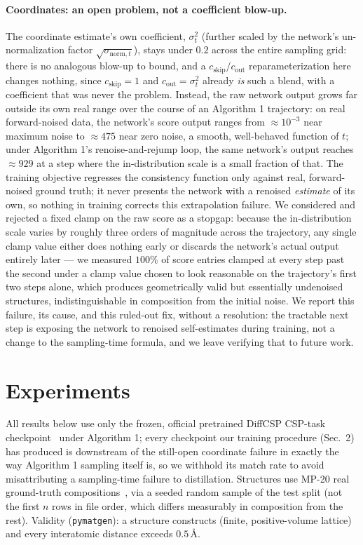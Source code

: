 \documentclass{article}
\begin{document}
\paragraph{Coordinates: an open problem, not a coefficient blow-up.}
\label{sec:coord-track}
The coordinate estimate's own coefficient, $\sigma_t^2$ (further scaled by the network's un-normalization factor $\sqrt{\sigma_{\text{norm},t}}$), stays under $0.2$ across the entire sampling grid: there is no analogous blow-up to bound, and a $c_{\text{skip}}/c_{\text{out}}$ reparameterization here changes nothing, since $c_{\text{skip}}{=}1$ and $c_{\text{out}}{=}\sigma_t^2$ already \emph{is} such a blend, with a coefficient that was never the problem. Instead, the raw network output grows far outside its own real range over the course of an Algorithm 1 trajectory: on real forward-noised data, the network's score output ranges from $\approx 10^{-3}$ near maximum noise to $\approx 475$ near zero noise, a smooth, well-behaved function of $t$; under Algorithm 1's renoise-and-rejump loop, the same network's output reaches $\approx 929$ at a step where the in-distribution scale is a small fraction of that. The training objective regresses the consistency function only against real, forward-noised ground truth; it never presents the network with a renoised \emph{estimate} of its own, so nothing in training corrects this extrapolation failure. We considered and rejected a fixed clamp on the raw score as a stopgap: because the in-distribution scale varies by roughly three orders of magnitude across the trajectory, any single clamp value either does nothing early or discards the network's actual output entirely later --- we measured $100\%$ of score entries clamped at every step past the second under a clamp value chosen to look reasonable on the trajectory's first two steps alone, which produces geometrically valid but essentially undenoised structures, indistinguishable in composition from the initial noise. We report this failure, its cause, and this ruled-out fix, without a resolution: the tractable next step is exposing the network to renoised self-estimates during training, not a change to the sampling-time formula, and we leave verifying that to future work.

\section{Experiments}
\label{sec:results}

All results below use only the frozen, official pretrained DiffCSP CSP-task checkpoint~\citep{Jiao:2023diffcsp} under Algorithm 1; every checkpoint our training procedure (Sec.~2) has produced is downstream of the still-open coordinate failure in exactly the way Algorithm 1 sampling itself is, so we withhold its match rate to avoid misattributing a sampling-time failure to distillation. Structures use MP-20 real ground-truth compositions~\citep{Xie:2022cdvae,Jain:2013mp}, via a seeded random sample of the test split (not the first $n$ rows in file order, which differs measurably in composition from the rest). Validity (\texttt{pymatgen}): a structure constructs (finite, positive-volume lattice) and every interatomic distance exceeds $0.5\,\text{\AA}$.
\end{document}
